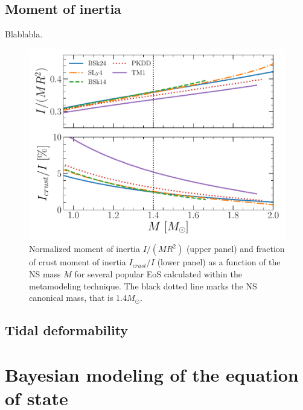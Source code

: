 \subsection{Moment of inertia} %

Blablabla.

\begin{figure}[!t]
\begin{center}
  \includegraphics[width=0.9\linewidth]{figures/moi_popular.pdf}
\end{center}
\caption[Crust thickness and mass for several popular EoS]{Normalized moment of
  inertia $I/(MR^2)$ (upper panel) and fraction of crust moment of inertia
  $I_{crust}/I$ (lower panel) as a function of the NS mass $M$ for several 
  popular EoS calculated within the metamodeling technique. The black dotted 
  line marks the NS canonical mass, that is $1.4M_\odot$.}\label{fig:moi_popular}
\end{figure}

\subsection{Tidal deformability} %


\section{Bayesian modeling of the equation of state} %

